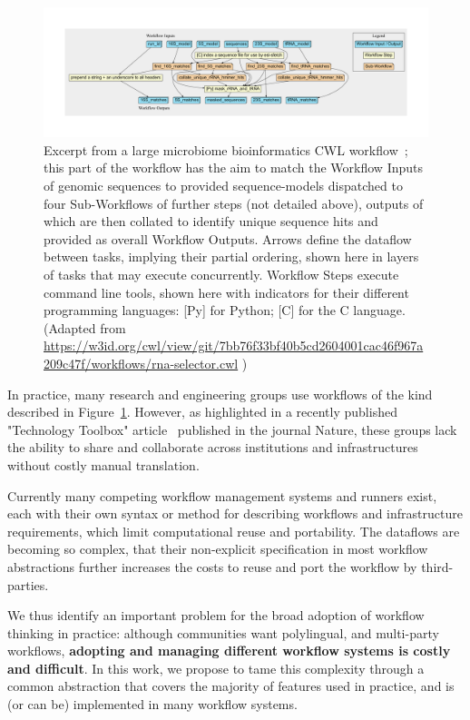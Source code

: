 \documentclass[sigconf,authordraft]{acmart}
\begin{document}
\begin{figure}
  \centering
 \includegraphics[width=\textwidth]{figure1}
  \caption{Excerpt from a large microbiome bioinformatics CWL workflow~\cite{mitchell_mgnify_2020}; this part of the workflow has the aim to match the Workflow Inputs of genomic sequences to provided sequence-models dispatched to four Sub-Workflows of further steps (not detailed above), outputs of which are then collated to identify unique sequence hits and provided as overall Workflow Outputs. Arrows define the dataflow between tasks, implying their partial ordering, shown here in layers of tasks that may execute concurrently.  Workflow Steps execute command line tools, shown here with indicators for their different programming languages: [Py] for Python; [C] for the C language. (Adapted from \url{https://w3id.org/cwl/view/git/7bb76f33bf40b5cd2604001cac46f967a209c47f/workflows/rna-selector.cwl} )}
  \label{fig:sample_workflow}
 \end{figure}
 
In practice, many research and engineering groups use workflows of the kind described in Figure~\ref{fig:sample_workflow}. However, as highlighted in a recently published "Technology Toolbox" article~\cite{perkel_workflow_2019} published in the journal Nature, these groups lack the ability to share and collaborate across institutions and infrastructures without costly manual translation.

Currently many competing workflow management systems and runners exist, each with their own syntax or method for describing workflows and infrastructure requirements, which limit computational reuse and portability. The dataflows are becoming so complex, that their non-explicit specification in most workflow abstractions further increases the costs to reuse and port the workflow by third-parties.

We thus identify an important problem for the broad adoption of workflow thinking in practice: although communities want polylingual, and multi-party workflows, \textbf{adopting and managing different workflow systems is costly and difficult}. In this work, we propose to tame this complexity through a common abstraction that covers the majority of features used in practice, and is (or can be) implemented in many workflow systems.
\end{document}
